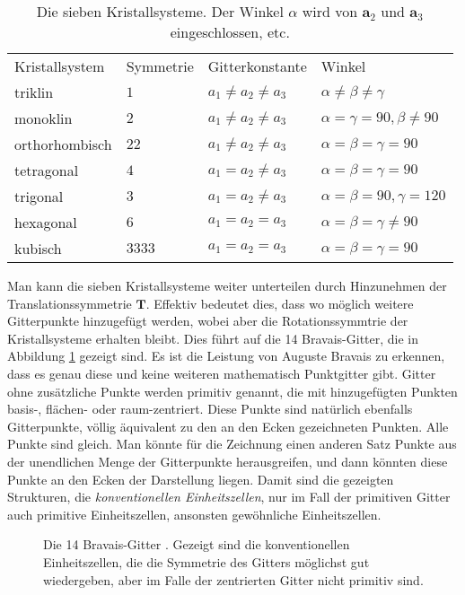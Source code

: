 \begin{table}
\begin{tabular}{llll}
Kristallsystem 	& 	Symmetrie & Gitterkonstante & Winkel \\
triklin 	&  	$1$						& $a_1 \neq a_2 \neq a_3$ &  $\alpha \neq \beta \neq \gamma$\\
monoklin 	& 	 $2$ 					& $a_1 \neq a_2 \neq a_3$ &  $\alpha = \gamma = 90, \beta \neq 90$\\
orthorhombisch 	& 	  $22$  & $a_1 \neq a_2 \neq a_3$ &  $\alpha= \beta =  \gamma = 90$\\
%
tetragonal 	&  $4$ & $a_1 = a_2 \neq a_3$ &   $\alpha= \beta =  \gamma = 90$\\
trigonal 	& 	 $3$ & $a_1 = a_2 \neq a_3$ &  $\alpha = \beta = 90, \gamma = 120$\\
hexagonal 	& 	  $6$  & $a_1 = a_2 = a_3$ &  $\alpha = \beta = \gamma \neq 90$\\
kubisch 	&  	$3333$  & $a_1= a_2=  a_3$ &  $\alpha= \beta =  \gamma = 90$\\
\end{tabular}
\caption{Die sieben Kristallsysteme. 
 Der Winkel $\alpha$ wird von $\mathbf{a}_2$ und  $\mathbf{a}_3$  eingeschlossen, etc.}
\end{table}


Man kann die sieben Kristallsysteme weiter unterteilen durch Hinzunehmen der Translationssymmetrie $\mathbf{T}$. Effektiv bedeutet dies, dass wo möglich weitere Gitterpunkte hinzugefügt werden, wobei aber die  Rotationssymmtrie der Kristallsysteme erhalten bleibt. 
Dies führt auf die 14 Bravais-Gitter, die in Abbildung \ref{fig:gitter_bravais14} gezeigt sind. Es ist die Leistung von Auguste Bravais zu erkennen, dass es genau diese und keine weiteren mathematisch Punktgitter gibt. Gitter ohne zusätzliche Punkte werden primitiv genannt, die mit hinzugefügten Punkten basis-, flächen- oder raum-zentriert. Diese Punkte sind natürlich ebenfalls Gitterpunkte, völlig äquivalent zu den an den Ecken gezeichneten Punkten. Alle Punkte sind gleich. Man könnte für die Zeichnung einen anderen Satz Punkte aus der unendlichen Menge der Gitterpunkte herausgreifen, und dann könnten diese Punkte an den Ecken der Darstellung liegen. Damit sind die gezeigten Strukturen, die \emph{konventionellen Einheitszellen}, nur im Fall der primitiven Gitter auch primitive Einheitszellen, ansonsten gewöhnliche  Einheitszellen.



\begin{figure}



\caption{Die 14 Bravais-Gitter \label{fig:gitter_bravais14}.  Gezeigt sind die konventionellen Einheitszellen, die die Symmetrie  des Gitters möglichst gut wiedergeben, aber im Falle der zentrierten Gitter nicht primitiv sind.
}
\end{figure}


